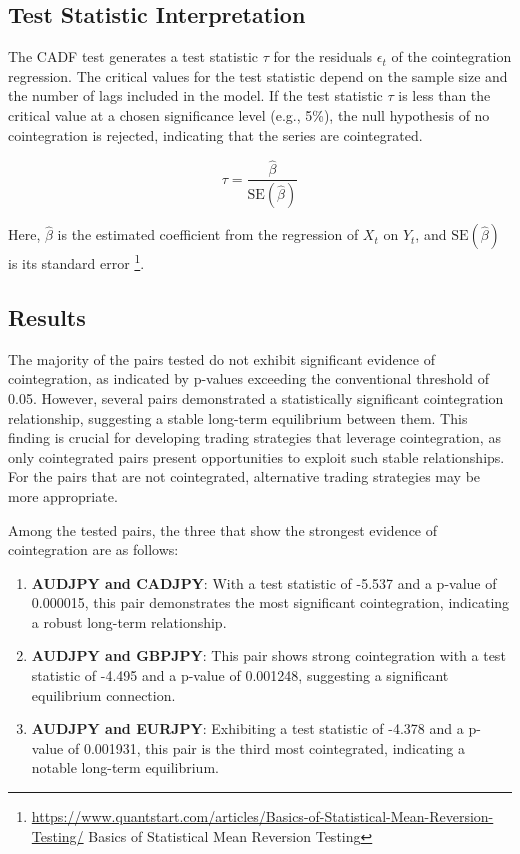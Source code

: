 \documentclass{article}
\begin{document}
\subsection{Test Statistic Interpretation}
The CADF test generates a test statistic \( \tau \) for the residuals \( \epsilon_t \) of the cointegration regression. The critical values for the test statistic depend on the sample size and the number of lags included in the model. If the test statistic \( \tau \) is less than the critical value at a chosen significance level (e.g., 5\%), the null hypothesis of no cointegration is rejected, indicating that the series are cointegrated.

\[
\tau = \frac{\hat{\beta}}{\text{SE}(\hat{\beta})}
\]

Here, \( \hat{\beta} \) is the estimated coefficient from the regression of \( X_t \) on \( Y_t \), and \( \text{SE}(\hat{\beta}) \) is its standard error \footnote{\url{https://www.quantstart.com/articles/Basics-of-Statistical-Mean-Reversion-Testing/} \newline Basics of Statistical Mean Reversion Testing}.


\subsection*{Results}
The majority of the pairs tested do not exhibit significant evidence of cointegration, as indicated by p-values exceeding the conventional threshold of 0.05. However, several pairs demonstrated a statistically significant cointegration relationship, suggesting a stable long-term equilibrium between them. This finding is crucial for developing trading strategies that leverage cointegration, as only cointegrated pairs present opportunities to exploit such stable relationships. For the pairs that are not cointegrated, alternative trading strategies may be more appropriate.

Among the tested pairs, the three that show the strongest evidence of cointegration are as follows:

\begin{enumerate}
    \item \textbf{AUDJPY and CADJPY}: With a test statistic of -5.537 and a p-value of 0.000015, this pair demonstrates the most significant cointegration, indicating a robust long-term relationship.
    \item \textbf{AUDJPY and GBPJPY}: This pair shows strong cointegration with a test statistic of -4.495 and a p-value of 0.001248, suggesting a significant equilibrium connection.
    \item \textbf{AUDJPY and EURJPY}: Exhibiting a test statistic of -4.378 and a p-value of 0.001931, this pair is the third most cointegrated, indicating a notable long-term equilibrium.
\end{enumerate}
\end{document}
